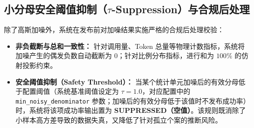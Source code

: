 \subsection[小分母安全阈值抑制与合规后处理]{小分母安全阈值抑制（$\tau$-Suppression）与合规后处理}
除了高斯加噪外，系统在发布前对加噪结果实施严格的合规后处理校验：
\begin{itemize}[leftmargin=2em]
  \item \textbf{非负截断与总和一致性：} 针对调用量、Token 总量等物理计数指标，系统将加噪产生的偶发负数自动截断为 0；针对比例分布指标，进行和为 $100\%$ 的仿射投影约束。
  \item \textbf{安全阈值抑制（Safety Threshold）：} 当某个统计单元加噪后的有效分母低于配置阈值（系统基准阈值设定为 $\tau = 1.0$，对应配置中的 \texttt{min\_noisy\_denominator} 参数；加噪后的有效分母低于该值时不发布成功率）时，系统将该项成功率输出置为 \textbf{SUPPRESSED（空值）}。该规则既消除了小样本高方差导致的数据失真，又降低了针对孤立个案的推断风险。
\end{itemize}
